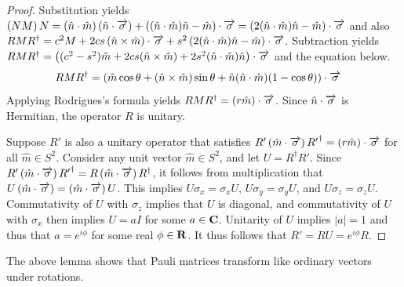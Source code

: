 \begin{proof}
	Substitution yields $\left(NM\right)N = \left(\hat{n} \cdot \hat{m}\right) \left(\hat{n} \cdot \overrightarrow{\sigma}\right) + \left((\hat{n} \cdot \hat{m}) \hat{n} - \hat{m}\right) \cdot \overrightarrow{\sigma} = \left(2(\hat{n} \cdot \hat{m}) \hat{n} - \hat{m}\right) \cdot \overrightarrow{\sigma}$ and also $R M R^\dagger = c^2 M + 2 c s \left(\hat{n} \times \hat{m}\right) \cdot \overrightarrow{\sigma} + s^2 \left(2(\hat{n} \cdot \hat{m}) \hat{n} - \hat{m}\right) \cdot \overrightarrow{\sigma}$.
	Subtraction yields $R M R^\dagger = \left((c^2 - s^2) \hat{m} + 2 c s (\hat{n} \times \hat{m}) + 2 s^2 (\hat{n} \cdot \hat{m}) \hat{n} \right) \cdot \overrightarrow{\sigma}$ and the equation below.
	\begin{align}
		R M R^\dagger & = \left(\hat{m} \cos \theta + (\hat{n} \times \hat{m}) \sin \theta + \hat{n} (\hat{n} \cdot \hat{m}) (1 - \cos \theta) \right) \cdot \overrightarrow{\sigma}
	\end{align}
	Applying Rodrigues's formula yields $R M R^\dagger = \left(r\hat{m} \right) \cdot \overrightarrow{\sigma}$.
	Since $\hat{n} \cdot \overrightarrow{\sigma}$ is Hermitian, the operator $R$ is unitary.

	Suppose $R'$ is also a unitary operator that satisfies $R' \left(\hat{m} \cdot \overrightarrow{\sigma}\right) {R'}^{\dagger} = \left(r \hat{m}\right) \cdot \overrightarrow{\sigma}$ for all $\hat{m} \in S^2$.
	Consider any unit vector $\hat{m} \in S^2$, and let $U = R^\dagger R'$.
	Since $R' \left(\hat{m} \cdot \overrightarrow{\sigma}\right) {R'}^\dagger = R \left(\hat{m} \cdot \overrightarrow{\sigma}\right) R^\dagger$, it follows from multiplication that $U \left(\hat{m} \cdot \overrightarrow{\sigma}\right) = \left(\hat{m} \cdot \overrightarrow{\sigma}\right) U$.
	This implies $U \sigma_x = \sigma_x U$, $U \sigma_y = \sigma_y U$, and $U \sigma_z = \sigma_z U$.
	Commutativity of $U$ with $\sigma_z$ implies that $U$ is diagonal, and commutativity of $U$ with $\sigma_x$ then implies $U = a I$ for some $a \in \mathbf{C}$.
	Unitarity of $U$ implies $\left|a\right|=1$ and thus that $a = e^{i \phi}$ for some real $\phi \in \mathbf{R}$.
	It thus follows that $R' = R U = e^{i \phi} R$.
\end{proof}

The above lemma shows that Pauli matrices transform like ordinary vectors under rotations.

